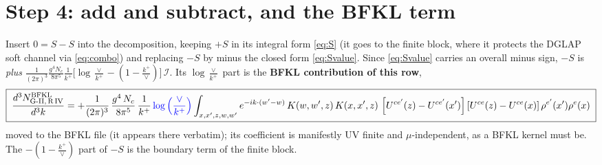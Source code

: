 \documentclass[10pt]{article}
\begin{document}
\section{Step 4: add and subtract, and the BFKL term}
Insert $0=S-S$ into the decomposition, keeping $+S$ in its integral form \eqref{eq:S} (it goes
to the finite block, where it protects the DGLAP soft channel via \eqref{eq:combo}) and
replacing $-S$ by minus the closed form \eqref{eq:Svalue}. Since \eqref{eq:Svalue} carries an
overall minus sign, $-S$ is \emph{plus}
$\frac{1}{(2\pi)^{3}}\frac{g^{4}N_{c}}{8\pi^{5}}\frac{1}{k^{+}}
\big[\log\frac{\vee}{k^{+}}-(1-\frac{k^{+}}{\vee})\big]\,\mathcal I$. Its
$\log\frac{\vee}{k^{+}}$ part is the \textbf{BFKL contribution of this row},
\begin{align}\label{eq:bfkl}
\boxed{\;\frac{d^{3}N^{\rm BFKL}_{\rm G\text{-}II,\,R\,IV}}{d^{3}k} = +\frac{1}{(2\pi)^{3}}\,\frac{g^{4}\,N_{c}}{8\pi^{5}}\,\frac{1}{k^{+}}\,{\color{blue}\log\Big(\frac{\vee}{k^{+}}\Big)}\int_{x,x',z,w,w'}e^{-ik\cdot (w'-w)}\,K(w,w',z)\,K(x,x',z)\,
\left[U^{ce'}(z) - U^{ce'}(x')\right]\left[U^{ce}(z) - U^{ce}(x)\right]\rho^{e'}(x')\rho^{e}(x)\;}
\end{align}
moved to the BFKL file (it appears there verbatim); its coefficient is manifestly UV finite
and $\mu$-independent, as a BFKL kernel must be. The $-(1-\frac{k^{+}}{\vee})$ part of $-S$ is
the boundary term of the finite block.
\end{document}
